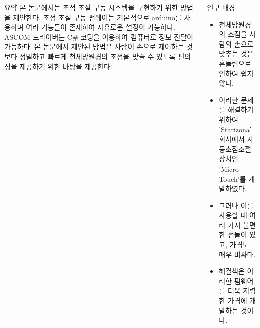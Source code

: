 \documentclass{gshs_poster_beamer}
\begin{document}
\pagestyle{fancy}
\maketitle

\begin{columns}[T]



\begin{posterbox}[colbacktitle=orange!70,coltitle=black,colback=orange!5]{요약}
본 논문에서는 초점 조절 구동 시스템을 구현하기 위한 방법을 제안한다. 초점 조절 구동 펌웨어는 기본적으로 arduino를 사용하며 여러 기능들이 존재하여 자유로운 설정이 가능하다. ASCOM 드라이버는 C\# 코딩을 이용하여 컴퓨터로 정보 전달이 가능하다. 본 논문에서 제안된 방법은 사람이 손으로 제어하는 것보다 정밀하고 빠르게 천체망원경의 초점을 맞출 수 있도록 편의성을 제공하기 위한 바탕을 제공한다.
\end{posterbox}

\vspace{1em}

\begin{posterbox}[colbacktitle=magenta!60,coltitle=black,colback=magenta!5]{연구 배경}
\begin{itemize}
	\item 천체망원경의 초점을 사람의 손으로 맞추는 것은 흔들림으로 인하여 쉽지 않다.
	\item 이러한 문제를 해결하기 위하여 'Starizona' 회사에서 자동초점조절 장치인 'Micro Touch'를 개발하였다.
	\item 그러나 이를 사용할 때 여러 가지 불편한 점들이 있고, 가격도 매우 비싸다.
	\item 해결책은 이러한 펌웨어를 더욱 저렴한 가격에 개발하는 것이다.
\end{itemize}
\end{posterbox}

\vspace{1em}


\end{columns}
\end{document}
